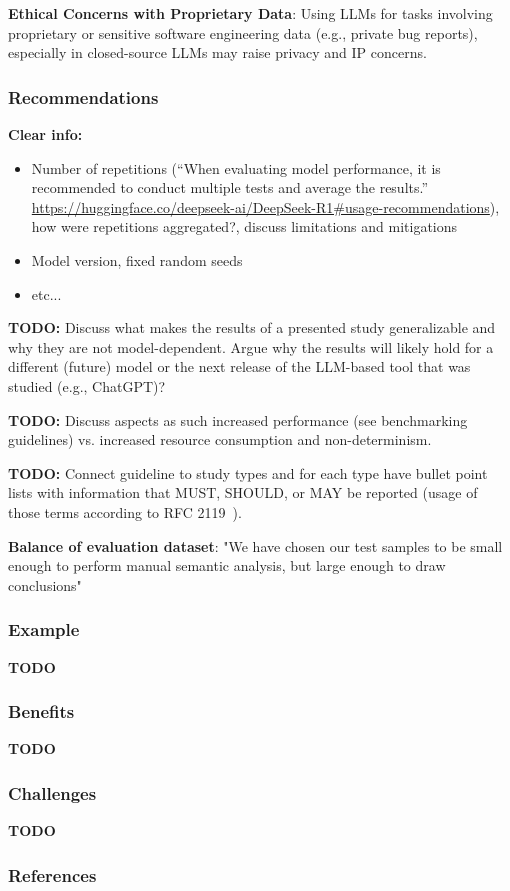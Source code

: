 \documentclass[11pt]{article}
\begin{document}
\textbf{Ethical Concerns with Proprietary Data}:
Using LLMs for tasks involving proprietary or sensitive software engineering data (e.g., private bug reports), especially in closed-source LLMs may raise privacy and IP concerns.

\subsubsection{Recommendations}

\textbf{Clear info:} 
\begin{itemize}
  \item Number of repetitions (``When evaluating model performance, it is recommended to conduct multiple tests and average the results.'' \url{https://huggingface.co/deepseek-ai/DeepSeek-R1\#usage-recommendations}), how were repetitions aggregated?, discuss limitations and mitigations
  \item Model version, fixed random seeds
  \item etc...
\end{itemize}


\textbf{TODO:} Discuss what makes the results of a presented study generalizable and why they are not model-dependent. Argue why the results will likely hold for a different (future) model or the next release of the LLM-based tool that was studied (e.g., ChatGPT)?

\textbf{TODO:} Discuss aspects as such increased performance (see benchmarking guidelines) vs. increased resource consumption and non-determinism.

\textbf{TODO:} Connect guideline to study types and for each type have bullet point lists with information that MUST, SHOULD, or MAY be reported (usage of those terms according to RFC 2119~\cite{rfc2119}).

\textbf{Balance of evaluation dataset}: "We have chosen our test samples to be small enough to perform manual semantic analysis, but large enough to draw conclusions"~\cite{tinnessoftware}

\subsubsection{Example}

\textbf{TODO}

\subsubsection{Benefits}

\textbf{TODO}

\subsubsection{Challenges}

\textbf{TODO}

\subsubsection{References}



\end{document}
